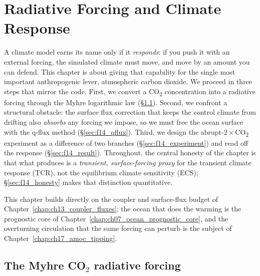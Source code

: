 \chapter{Radiative Forcing and Climate Response}\label{chap:ch14_forcing_response}

\providecommand{\Forc}{F}                 %
\providecommand{\Qflux}{\overline{Q}}     %
\providecommand{\Hrest}{\lambda}          %
\providecommand{\SST}{T_{\mathrm{s}}}     %
\providecommand{\SSTt}{T^{\star}}         %

A climate model earns its name only if it \emph{responds}: if you push it with an
external forcing, the simulated climate must move, and move by an amount you can
defend. This chapter is about giving \model{} that capability for the single most
important anthropogenic lever, atmospheric carbon dioxide. We proceed in three
steps that mirror the code. First, we convert a CO\textsubscript{2} concentration
into a radiative forcing through the Myhre logarithmic law
(\S\ref{sec:f14_myhre}). Second, we confront a structural obstacle: the surface
flux correction that keeps the control climate from drifting also \emph{absorbs}
any forcing we impose, so we must free the ocean surface with the q-flux method
(\S\ref{sec:f14_qflux}). Third, we design the abrupt-$2\times$CO\textsubscript{2}
experiment as a difference of two branches (\S\ref{sec:f14_experiment}) and read
off the response (\S\ref{sec:f14_result}). Throughout, the central honesty of the
chapter is that what \model{} produces is a \emph{transient, surface-forcing
proxy} for the transient climate response (TCR), not the equilibrium climate
sensitivity (ECS); \S\ref{sec:f14_honesty} makes that distinction quantitative.

This chapter builds directly on the coupler and surface-flux budget of
Chapter~\ref{chap:ch13_coupler_fluxes}; the ocean that does the warming is the
prognostic core of Chapter~\ref{chap:ch07_ocean_prognostic_core}, and the
overturning circulation that the same forcing can perturb is the subject of
Chapter~\ref{chap:ch17_amoc_tipping}.

\section{The Myhre CO\texorpdfstring{$_2$}{2} radiative forcing}\label{sec:f14_myhre}

